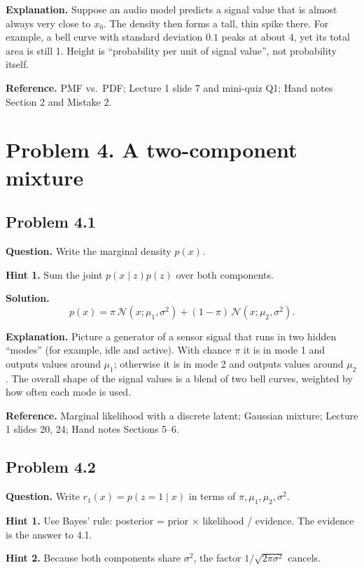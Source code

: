 \documentclass[11pt]{article}
\begin{document}
\textbf{Explanation.} Suppose an audio model predicts a signal value that is almost always very close to $x_0$. The density then forms a tall, thin spike there. For example, a bell curve with standard deviation $0.1$ peaks at about $4$, yet its total area is still 1. Height is ``probability per unit of signal value'', not probability itself.

\textbf{Reference.} PMF vs.\ PDF; Lecture 1 slide 7 and mini-quiz Q1; Hand notes Section 2 and Mistake 2.

\section*{Problem 4. A two-component mixture}

\subsection*{Problem 4.1}
\textbf{Question.} Write the marginal density $p(x)$.

\textbf{Hint 1.} Sum the joint $p(x\mid z)p(z)$ over both components.

\textbf{Solution.}
\[
p(x) = \pi\,\mathcal{N}(x;\mu_1,\sigma^2) + (1-\pi)\,\mathcal{N}(x;\mu_2,\sigma^2).
\]

\textbf{Explanation.} Picture a generator of a sensor signal that runs in two hidden ``modes'' (for example, idle and active). With chance $\pi$ it is in mode 1 and outputs values around $\mu_1$; otherwise it is in mode 2 and outputs values around $\mu_2$. The overall shape of the signal values is a blend of two bell curves, weighted by how often each mode is used.

\textbf{Reference.} Marginal likelihood with a discrete latent; Gaussian mixture; Lecture 1 slides 20, 24; Hand notes Sections 5--6.

\subsection*{Problem 4.2}
\textbf{Question.} Write $r_1(x)=p(z=1\mid x)$ in terms of $\pi,\mu_1,\mu_2,\sigma^2$.

\textbf{Hint 1.} Use Bayes' rule: posterior = prior $\times$ likelihood / evidence. The evidence is the answer to 4.1.

\textbf{Hint 2.} Because both components share $\sigma^2$, the factor $1/\sqrt{2\pi\sigma^2}$ cancels.
\end{document}
